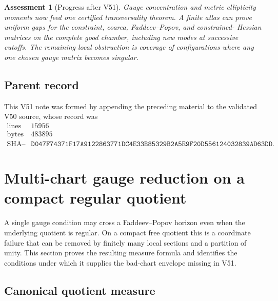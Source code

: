 \documentclass[11pt]{article}
\newtheorem{assessment}[theorem]{Assessment}
\begin{document}
\begin{assessment}[Progress after V51]
\label{ass:v11v51-status}
Gauge concentration and metric ellipticity moments now feed one
certified transversality theorem.  A finite atlas can prove uniform
gaps for the constraint, coarea, Faddeev--Popov, and constrained-
Hessian matrices on the complete good chamber, including new modes at
successive cutoffs.  The remaining local obstruction is coverage of
configurations where any one chosen gauge matrix becomes singular.
\end{assessment}

\subsection{Parent record}

This V51 note was formed by appending the preceding material to the
validated V50 source, whose record was
\[
\begin{array}{c|c}
\text{lines}&15956\\
\text{bytes}&483895\\
\text{SHA--256}&
\texttt{D047F74371F17A9122863771DC4E33B85329B2A5E9F20D556124032839AD63DD}.
\end{array}                                                     \tag{51.23}
\]


\section{Multi-chart gauge reduction on a compact regular quotient}
\label{sec:v11v52}

A single gauge condition may cross a Faddeev--Popov horizon even when
the underlying quotient is regular.  On a compact free quotient this
is a coordinate failure that can be removed by finitely many local
sections and a partition of unity.  This section proves the resulting
measure formula and identifies the conditions under which it supplies
the bad-chart envelope missing in V51.

\subsection{Canonical quotient measure}
\end{document}
